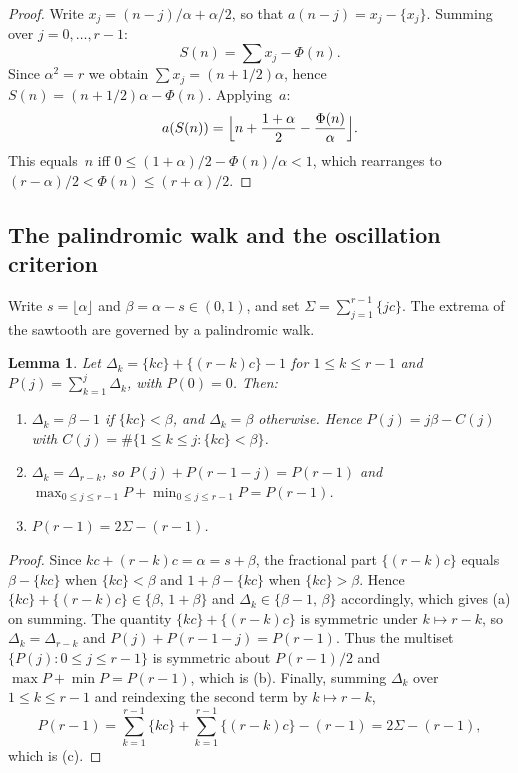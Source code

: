 \documentclass{birkjour}
\newtheorem{lemma}[theorem]{Lemma}
\theoremstyle{definition}
\theoremstyle{remark}
\newcommand{\fl}[1]{\lfloor #1 \rfloor}
\newcommand{\frc}[1]{\{ #1 \}}
\begin{document}
\begin{proof}
Write $x_{j}=(n{-}j)/\alpha+\alpha/2$, so that
$a(n{-}j)=x_{j}-\{x_{j}\}$.
Summing over $j=0,\ldots,r{-}1$:
\[
  S(n)=\sum x_{j}-\Phi(n).
\]
Since $\alpha^{2}=r$ we obtain
$\sum x_{j}=(n+1/2)\alpha$, hence
$S(n)=(n+1/2)\alpha-\Phi(n)$.
Applying~$a$:
\[
  a(S(n))
  =\Bigl\lfloor
  n+\frac{1+\alpha}{2}
  -\frac{\Phi(n)}{\alpha}
  \Bigr\rfloor.
\]
This equals~$n$ iff
$0\le(1{+}\alpha)/2-\Phi(n)/\alpha<1$,
which rearranges to $(r{-}\alpha)/2<\Phi(n)
\le(r{+}\alpha)/2$.
\end{proof}

\subsection{The palindromic walk and the oscillation criterion}
\label{ssec:walk}

Write $s=\fl{\alpha}$ and $\beta=\alpha-s\in(0,1)$, and set
$\Sigma=\sum_{j=1}^{r-1}\frc{jc}$. The extrema of the sawtooth
are governed by a palindromic walk.

\begin{lemma}\label{lem:walk}
Let $\Delta_{k}=\frc{kc}+\frc{(r{-}k)c}-1$ for
$1\le k\le r-1$ and $P(j)=\sum_{k=1}^{j}\Delta_{k}$, with
$P(0)=0$. Then:
\begin{enumerate}
\item[\textup{(a)}] $\Delta_{k}=\beta-1$ if $\frc{kc}<\beta$,
  and $\Delta_{k}=\beta$ otherwise. Hence
  $P(j)=j\beta-C(j)$ with
  $C(j)=\#\{1\le k\le j:\frc{kc}<\beta\}$.
\item[\textup{(b)}] $\Delta_{k}=\Delta_{r-k}$, so
  $P(j)+P(r{-}1{-}j)=P(r{-}1)$ and
  $\max_{0\le j\le r-1}P+\min_{0\le j\le r-1}P=P(r{-}1)$.
\item[\textup{(c)}] $P(r{-}1)=2\Sigma-(r{-}1)$.
\end{enumerate}
\end{lemma}

\begin{proof}
Since $kc+(r{-}k)c=\alpha=s+\beta$, the fractional part
$\frc{(r{-}k)c}$ equals $\beta-\frc{kc}$ when $\frc{kc}<\beta$
and $1+\beta-\frc{kc}$ when $\frc{kc}>\beta$. Hence
$\frc{kc}+\frc{(r{-}k)c}\in\{\beta,\,1+\beta\}$ and
$\Delta_{k}\in\{\beta-1,\,\beta\}$ accordingly, which gives
(a) on summing. The quantity $\frc{kc}+\frc{(r{-}k)c}$ is
symmetric under $k\mapsto r-k$, so $\Delta_{k}=\Delta_{r-k}$
and $P(j)+P(r{-}1{-}j)=P(r{-}1)$. Thus the multiset
$\{P(j):0\le j\le r-1\}$ is symmetric about $P(r{-}1)/2$ and
$\max P+\min P=P(r{-}1)$, which is (b). Finally, summing
$\Delta_{k}$ over $1\le k\le r-1$ and reindexing the second
term by $k\mapsto r-k$,
\[
  P(r{-}1)=\sum_{k=1}^{r-1}\frc{kc}
  +\sum_{k=1}^{r-1}\frc{(r{-}k)c}-(r{-}1)=2\Sigma-(r{-}1),
\]
which is (c).
\end{proof}
\end{document}
